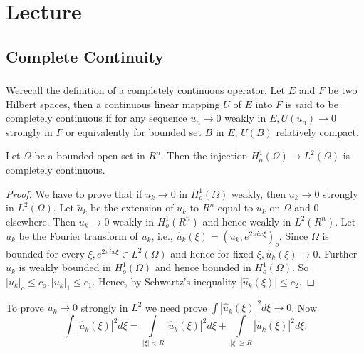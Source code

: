 
\chapter{Lecture}\label{lec9}%

\setcounter{section}{4}
\section{Complete Continuity}\label{lec9:sec5}%

\subsection{}\label{lec9:sec5:subsec1}
 
We\pageoriginale recall the definition of a completely
continuous operator. Let $E$ 
and $F$ be two Hilbert spaces, then a continuous linear mapping $U$ of
$E$ into $F$ is said to be completely continuous if for any sequence
$u_n \to 0$ weakly in $E, U (u_n) \to 0$ strongly in $F$ or
equivalently for bounded set $B$ in $E$, $U(B)$ relatively compact. 

\begin{theorem}\label{lec9:sec5:subsec1:thm5.1}%
  Let $\Omega$ be a bounded open set in $R^n$. Then the injection
  $H^1_o (\Omega) \to L^2 (\Omega)$ is completely continuous. 
\end{theorem}

\begin{proof}
We have to prove that if $u_k \to 0$ in $H^1_o (\Omega)$ weakly, then
$u_k \to 0$ strongly in $L^2 (\Omega)$. Let $\tilde{u}_k$ be the
extension of $u_k$ to $R^n$ equal to $u_k$ on $\Omega$ and $0$
elsewhere. Then $u_k \to 0$ weakly in $H^1_o (R^n)$ and hence weakly
in $L^2 (R^n)$. Let $\hat{u}_k$ be the Fourier transform of $u_k$,
i.e., $\hat{u}_k (\xi)= (u_k , e^{2 \pi ix \xi})_o$. Since $\Omega$ is
bounded for every $\xi , e^{2 \pi ix \xi} \in L^2 (\Omega)$
and hence for fixed $\xi , \hat{u}_k (\xi)\to 0$. Further $u_k$ is
weakly bounded in $H^1_o (\Omega)$ and hence bounded in $H^1_o
(\Omega)$. So $|u_k|_o \leq c_o, |u_k|_1 \leq c_1$. Hence, by
Schwartz's inequality $|\hat{u}_k (\xi)|\leq c_2$. 
\end{proof}

To prove $u_k \to 0$ strongly in $L^2$ we need prove $\int |\hat{u}_k
(\xi)|^2 d \xi \to 0$. Now 
$$ 
\int |\hat{u}_k (\xi)|^2 d \xi = \int\limits_{|\xi|< R} |\hat{u}_k
(\xi)|^2 d \xi + \int\limits_{|\xi|\geq R} |\hat{u}_k (\xi)|^2 d \xi. 
$$

